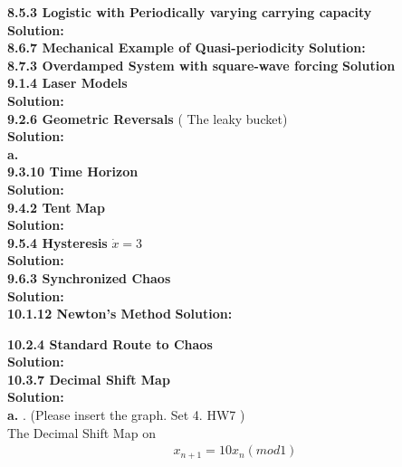 \documentclass[12pt]{article}
\begin{document}
{\bf 8.5.3 Logistic with Periodically varying carrying capacity }\\
{\bf Solution: }\\

\noindent
{\bf 8.6.7 Mechanical Example of Quasi-periodicity}
{\bf Solution:}\\

\noindent
{\bf 8.7.3 Overdamped System with square-wave forcing } 
{\bf Solution} \\

{\bf 9.1.4 Laser Models}\\
{\bf Solution: } \\
{\bf 9.2.6 Geometric Reversals} ( The leaky bucket)\\
{\bf Solution:}\\
\indent
{\bf a. } \\

\bigskip\noindent
{\bf 9.3.10 Time Horizon} \\
{\bf Solution:} \\

{\bf 9.4.2 Tent Map}\\
{\bf Solution:}\\
 
{\bf 9.5.4 Hysteresis} $\dot{x}=3$\\
{\bf Solution: }\\

\pagebreak
\noindent
{\bf 9.6.3 Synchronized Chaos}\\
{\bf Solution: }\\

\noindent
{\bf 10.1.12 Newton's Method} 
{\bf Solution:}\\
\indent

\bigskip\noindent
{\bf 10.2.4 Standard Route to Chaos}\\
{\bf Solution:} \\
\noindent
{\bf 10.3.7 Decimal Shift Map}\\
{\bf Solution: }\\

{\bf a. } . (Please insert the graph. Set 4. HW7 )\\
The Decimal Shift Map on
\begin{align*}
x_{n+1}=10x_n(mod1)
\end{align*} 
\end{document}
